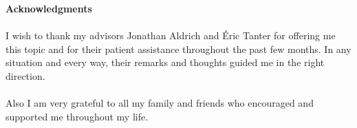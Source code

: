 
\vspace*{15\baselineskip}
\textbf{Acknowledgments}\\\\
I wish to thank my advisors Jonathan Aldrich and Éric Tanter for offering me this topic and for their patient assistance throughout the past few months. In any situation and every way, their remarks and thoughts guided me in the right direction.\\\\
Also I am very grateful to all my family and friends who encouraged and supported me throughout my life.